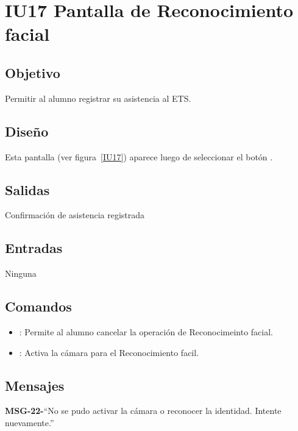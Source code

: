 \section{IU17 Pantalla de Reconocimiento facial}

\subsection{Objetivo}
Permitir al alumno registrar su asistencia al ETS.

\subsection{Diseño}
Esta pantalla  (ver figura~\ref{IU17}) aparece luego de seleccionar el botón .


\subsection{Salidas}
Confirmación de asistencia registrada

\subsection{Entradas}
Ninguna


\subsection{Comandos}
\begin{itemize}
	\item {}: Permite al alumno cancelar la operación de Reconocimeinto facial.
	\item {}: Activa la cámara para el Reconocimiento facil. 
\end{itemize}

\subsection{Mensajes}

\begin{Citemize}
	\item {\bf MSG-22-}{``No se pudo activar la cámara o reconocer la identidad. Intente nuevamente.''}
\end{Citemize}